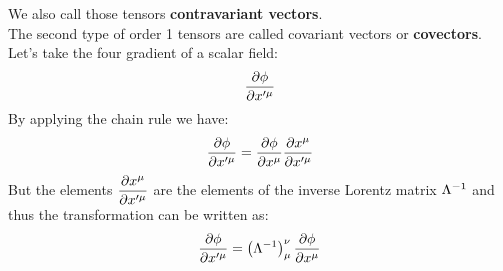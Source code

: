 We also call those tensors \textbf{contravariant vectors}.\\
The second type of order 1 tensors are called covariant vectors or \textbf{covectors}. Let's take the four gradient of a scalar field:
\begin{equation}
  \pdv{\phi}{x'^{\mu}}
\end{equation}
By applying the chain rule we have:
\begin{equation}
  \pdv{\phi}{x'^{\mu}} = \pdv{\phi}{x^{\mu}}\pdv{x^{\mu}}{x'^{\mu}}
\end{equation}
But the elements $\pdv{x^{\mu}}{x'^{\mu}}$ are the elements of the inverse Lorentz matrix $\Lambda^{-1}$ and thus the transformation can be written as:
\begin{equation}
  \pdv{\phi}{x'^{\mu}} = \brackets{\lm^{-1}}^{\nu}_{\mu} \pdv{\phi}{x^{\mu}}
\end{equation}
